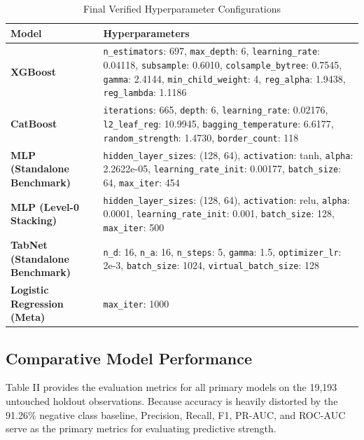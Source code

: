 \documentclass[conference]{IEEEtran}
\begin{document}
\begin{table}[htbp]
\caption{Final Verified Hyperparameter Configurations}
\begin{center}
\begin{tabular}{|p{3cm}|p{5cm}|}
\hline
\textbf{Model} & \textbf{Hyperparameters} \\
\hline
\textbf{XGBoost} & \texttt{n\_estimators}: 697, \texttt{max\_depth}: 6, \texttt{learning\_rate}: 0.04118, \texttt{subsample}: 0.6010, \texttt{colsample\_bytree}: 0.7545, \texttt{gamma}: 2.4144, \texttt{min\_child\_weight}: 4, \texttt{reg\_alpha}: 1.9438, \texttt{reg\_lambda}: 1.1186 \\ \hline
\textbf{CatBoost} & \texttt{iterations}: 665, \texttt{depth}: 6, \texttt{learning\_rate}: 0.02176, \texttt{l2\_leaf\_reg}: 10.9945, \texttt{bagging\_temperature}: 6.6177, \texttt{random\_strength}: 1.4730, \texttt{border\_count}: 118 \\ \hline
\textbf{MLP (Standalone Benchmark)} & \texttt{hidden\_layer\_sizes}: (128, 64), \texttt{activation}: tanh, \texttt{alpha}: 2.2622e-05, \texttt{learning\_rate\_init}: 0.00177, \texttt{batch\_size}: 64, \texttt{max\_iter}: 454 \\ \hline
\textbf{MLP (Level-0 Stacking)} & \texttt{hidden\_layer\_sizes}: (128, 64), \texttt{activation}: relu, \texttt{alpha}: 0.0001, \texttt{learning\_rate\_init}: 0.001, \texttt{batch\_size}: 128, \texttt{max\_iter}: 500 \\ \hline
\textbf{TabNet (Standalone Benchmark)} & \texttt{n\_d}: 16, \texttt{n\_a}: 16, \texttt{n\_steps}: 5, \texttt{gamma}: 1.5, \texttt{optimizer\_lr}: 2e-3, \texttt{batch\_size}: 1024, \texttt{virtual\_batch\_size}: 128 \\ \hline
\textbf{Logistic Regression (Meta)} & \texttt{max\_iter}: 1000 \\ \hline
\end{tabular}
\label{tab1}
\end{center}
\end{table}


\subsection{Comparative Model Performance}
Table II provides the evaluation metrics for all primary models on the 19,193 untouched holdout observations. Because accuracy is heavily distorted by the 91.26\% negative class baseline, Precision, Recall, F1, PR-AUC, and ROC-AUC serve as the primary metrics for evaluating predictive strength.
\end{document}
